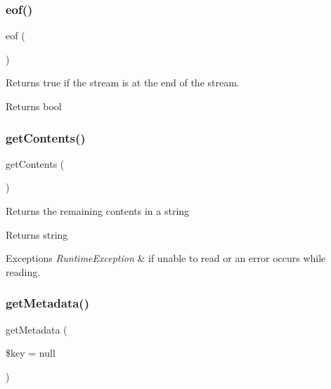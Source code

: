 \subsubsection{\texorpdfstring{eof()}{eof()}}
{\footnotesize\ttfamily eof (\begin{DoxyParamCaption}{ }\end{DoxyParamCaption})}

Returns true if the stream is at the end of the stream.

\begin{DoxyReturn}{Returns}
bool 
\end{DoxyReturn}
\mbox{\label{class_pes_1_1_http_1_1_stream_a14814e04b348120748912692645f3a75}} 
\subsubsection{\texorpdfstring{get\+Contents()}{getContents()}}
{\footnotesize\ttfamily get\+Contents (\begin{DoxyParamCaption}{ }\end{DoxyParamCaption})}

Returns the remaining contents in a string

\begin{DoxyReturn}{Returns}
string
\end{DoxyReturn}

\begin{DoxyExceptions}{Exceptions}
{\em Runtime\+Exception} & if unable to read or an error occurs while reading. \\
\hline
\end{DoxyExceptions}
\mbox{\label{class_pes_1_1_http_1_1_stream_a710dbc5f59acad99675d3d608f46fe7f}} 
\subsubsection{\texorpdfstring{get\+Metadata()}{getMetadata()}}
{\footnotesize\ttfamily get\+Metadata (\begin{DoxyParamCaption}\item[{}]{\$key = {\ttfamily null} }\end{DoxyParamCaption})}

